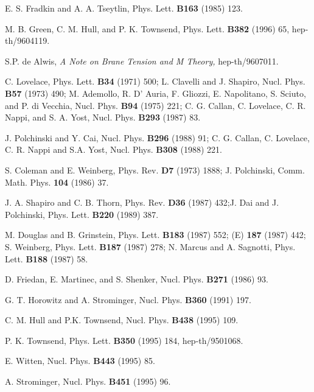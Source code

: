 \documentclass[12pt]{article}
\begin{document}
\begin{thebibliography}{99}
E. S. Fradkin and A. A. Tseytlin, Phys.
Lett. {\bf B163} (1985) 123.

M. B. Green, C. M. Hull, and P. K. Townsend,
Phys. Lett. {\bf B382} (1996) 65, hep-th/9604119.

S.P. de Alwis, {\it A Note on Brane Tension and M Theory,}
hep-th/9607011.

C. Lovelace, Phys. Lett. {\bf B34} (1971) 500;\hfil\break
L. Clavelli and J. Shapiro, Nucl. Phys. {\bf B57} (1973) 490;\hfil\break
M. Ademollo, R. D' Auria, F. Gliozzi, E. Napolitano, S. Sciuto, and P. di
Vecchia, Nucl. Phys. {\bf B94} (1975) 221;\hfil\break
C. G. Callan, C. Lovelace, C. R. Nappi, and S. A. Yost,
Nucl. Phys. {\bf B293} (1987) 83.

J. Polchinski and Y. Cai, Nucl. Phys. {\bf B296} (1988) 91;\hfil\break 
C. G. Callan, C. Lovelace, C. R. Nappi and S.A. Yost,
Nucl. Phys. {\bf B308} (1988) 221.

S. Coleman and E. Weinberg, Phys. Rev. {\bf D7}
(1973) 1888;\hfil\break 
J. Polchinski, Comm. Math. Phys. {\bf 104}
(1986) 37.

J. A. Shapiro and C. B. Thorn, Phys.
Rev. {\bf D36} (1987) 432;\hfil\break J. Dai and J. Polchinski, Phys. Lett.
{\bf B220} (1989) 387.


M. Douglas and B. Grinstein, Phys. Lett. {\bf B183} (1987) 552; (E) {\bf 187}
(1987) 442;\hfil\break 
S. Weinberg, Phys. Lett. {\bf B187} (1987) 278;\hfil\break
N. Marcus and A. Sagnotti, Phys. Lett. {\bf B188} (1987) 58.

D. Friedan, E. Martinec, and S. Shenker, Nucl. Phys. {\bf B271}
(1986) 93.

G. T. Horowitz and A. Strominger,
Nucl. Phys. {\bf B360} (1991) 197.

C. M. Hull and P.K. Townsend,
Nucl. Phys. {\bf B438} (1995) 109.

P. K. Townsend, Phys. Lett. {\bf B350} (1995) 184, 
hep-th/9501068.

E. Witten, Nucl. Phys. {\bf B443} (1995) 85.

A. Strominger, Nucl. Phys. {\bf B451} (1995) 96.


\end{thebibliography}
\end{document}
